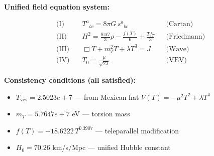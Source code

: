 
\textbf{Unified field equation system:}

\begin{align}
  \text{(I)} \quad & T^a{}_{bc} = 8\pi G \, s^a{}_{bc} && \text{(Cartan)} \\
  \text{(II)} \quad & H^2 = \frac{8\pi G}{3}\rho - \frac{f(T)}{6} + \frac{Tf_T}{3} && \text{(Friedmann)} \\
  \text{(III)} \quad & \Box T + m_T^2 T + \lambda T^3 = J && \text{(Wave)} \\
  \text{(IV)} \quad & T_0 = \frac{\mu}{\sqrt{2\lambda}} && \text{(VEV)}
\end{align}

\textbf{Consistency conditions (all satisfied):}
\begin{itemize}
  \item $T_{\text{vev}} = 2.5023e+7$ — from Mexican hat $V(T) = -\mu^2 T^2 + \lambda T^4$
  \item $m_T = 5.7647e+7$ eV — torsion mass
  \item $f(T) = -18.6222 \, T^{0.3907}$ — teleparallel modification
  \item $H_0 = 70.26$ km/s/Mpc — unified Hubble constant
\end{itemize}